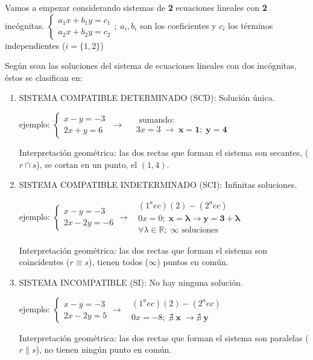 \small{Vamos a empezar considerando sistemas de \textbf{2} ecuaciones lineales con \textbf{2} incógnitas. 
$\begin{cases}a_1x+b_1y=c_1\\a_2x+b_2y=c_2\end{cases}; \; a_i,b_i$ son los coeficientes y $c_i$ los términos independientes ($i=\{1,2\}$)}
\begin{defi}
Según sean las soluciones del sistema de ecuaciones lineales con dos incógnitas, éstos se clasifican en:	
\begin{enumerate}
\item \small{SISTEMA COMPATIBLE DETERMINADO (SCD): Solución única.}

\small{ejemplo: $\begin{cases} x-y=-3 \\2x+y=6 \end{cases} $
$\to \quad  \begin{matrix} 
\text{ sumando: } 
\\ 3x=3\;\to \;    \boldsymbol{x=1; \; y=4}
\end{matrix}$}

\small{Interpretación geométrica: las dos rectas que forman el sistema son secantes, ($r\cap s$), se cortan en un punto, el $(1,4)$.}
\item \small{SISTEMA COMPATIBLE INDETERMINADO (SCI): Infinitas soluciones.}

\small{ejemplo: $\begin{cases} x-y=-3 \\2x-2y=-6 \end{cases} \to \; \; \begin{matrix}  (1^a ec)(2)-(2^a ec) \\  0x=0;\;   \boldsymbol{x=\lambda} \to  \boldsymbol{y=3+\lambda} \\ \forall \lambda \in \mathbb R; \; \infty \text{ soluciones}\end{matrix}$	}

\small{Interpretación geométrica: las dos rectas que forman el sistema son coincidentes ($r \equiv s$), tienen todos ($\infty$) puntos en común.}
\item \small{SISTEMA INCOMPATIBLE (SI): No hay ninguna solución.}

\small{ejemplo: $\begin{cases} x-y=-3 \\2x-2y=5 \end{cases} \to \; \; \begin{matrix}  (1^a ec)(2)-(2^a ec) \\  0x=-8;\;   \boldsymbol{\nexists \; x}\; \to  \boldsymbol{\nexists \;  y} \end{matrix}$}	

\small{Interpretación geométrica: las dos rectas que forman el sistema son paralelas ($r \parallel s$), no tienen ningún punto en común.}
\end{enumerate}
\end{defi}

